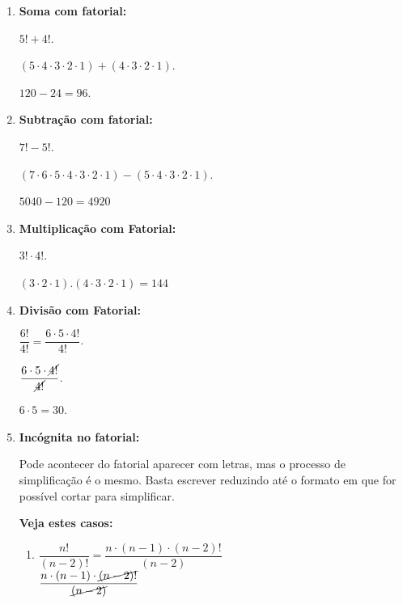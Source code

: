 \begin{multicols*}{2}
    \begin{enumerate}

        \item \textbf{Soma com fatorial:}

              $5! + 4!$.

              $ (5 \cdot 4 \cdot 3 \cdot 2 \cdot 1) + (4 \cdot 3 \cdot 2 \cdot 1)$.

              $ 120 - 24 = 96 $.

        \item \textbf{Subtração com fatorial:}

              $ 7! - 5! $.

              $ (7 \cdot 6 \cdot 5 \cdot 4 \cdot 3 \cdot 2 \cdot 1) - (5 \cdot 4 \cdot 3 \cdot 2 \cdot 1) $.

              $ 5040 - 120 = 4920 $

        \item \textbf{Multiplicação com Fatorial:}

              $ 3! \cdot 4! $.

              $ (3 \cdot 2 \cdot 1) . ( 4 \cdot 3 \cdot2 \cdot1) = 144 $

        \item \textbf{Divisão com Fatorial:}

              $ \dfrac{6!}{4!} = \dfrac{6 \cdot 5 \cdot 4!}{4!}$.

              $ \dfrac{6 \cdot 5 \cdot \cancel{4!}}{\cancel{4!}} $.

              $ 6 \cdot 5 = 30 $.

        \item \textbf{Incógnita no fatorial:}

              Pode acontecer do fatorial aparecer com letras, mas o processo de simplificação é o mesmo. Basta escrever reduzindo até o formato em que for possível cortar para simplificar.

              \textbf{Veja estes casos:}

              \begin{enumerate}

                  \item 	$ \dfrac{n!}{(n - 2)!} = \dfrac{n \cdot (n - 1) \cdot ( n - 2)!}{(n - 2)} $\\

                        $ \dfrac{n \cdot (n - 1) \cdot \cancel{( n - 2)!}}{\cancel{(n - 2)}} $\\


\end{enumerate}
\end{enumerate}
\end{multicols*}
